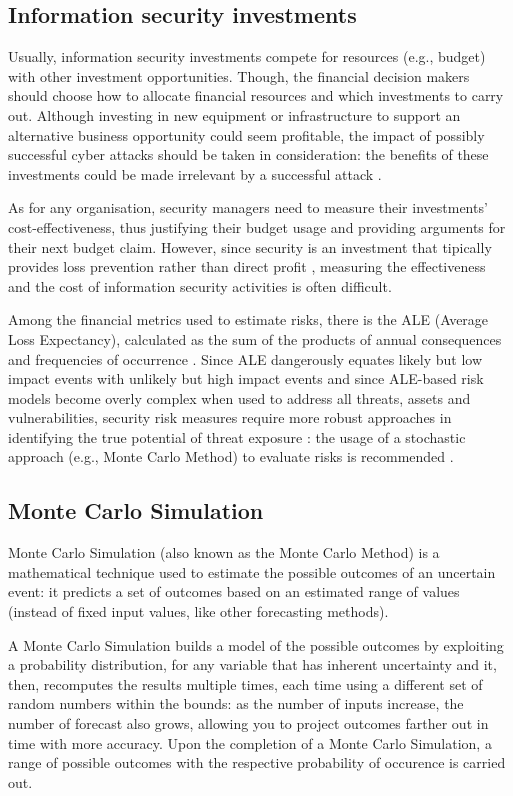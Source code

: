 \subsection{Information security investments}
Usually, information security investments compete for resources (e.g., budget) with other investment opportunities. Though, the financial decision makers should choose how to allocate financial resources and which investments to carry out.
Although investing in new equipment or infrastructure to support an alternative business opportunity could seem profitable, the impact of possibly successful cyber attacks should be taken in consideration: the benefits of these investments could be made irrelevant by a successful attack \parencite{Conrad}.

As for any organisation, security managers need to measure their investments' cost-effectiveness, thus justifying their budget usage and providing arguments for their next budget claim.
However, since security is an investment that tipically provides loss prevention rather than direct profit \parencite{ENISA}, measuring the effectiveness and the cost of information security activities is often difficult.

Among the financial metrics used to estimate risks, there is the ALE (Average Loss Expectancy), calculated as the sum of the products of annual consequences and frequencies of occurrence \parencite{NBS}.
Since ALE dangerously equates likely but low impact events with unlikely but high impact events and since ALE-based risk models become overly complex when used to address all threats, assets and vulnerabilities, security risk measures require more robust approaches in identifying the true potential of threat exposure \parencite{Sectara}: the usage of a stochastic approach (e.g., Monte Carlo Method) to evaluate risks is recommended \parencite{Soo_Hoo}.

\subsection{Monte Carlo Simulation}
Monte Carlo Simulation (also known as the Monte Carlo Method) is a mathematical technique used to estimate the possible outcomes of an uncertain event: it predicts a set of outcomes based on an estimated range of values (instead of fixed input values, like other forecasting methods).

A Monte Carlo Simulation builds a model of the possible outcomes by exploiting a probability distribution, for any variable that has inherent uncertainty and it, then, recomputes the results multiple times, each time using a different set of random numbers within the bounds: as the number of inputs increase, the number of forecast also grows, allowing you to project outcomes farther out in time with more accuracy.
Upon the completion of a Monte Carlo Simulation, a range of possible outcomes with the respective probability of occurence is carried out.

